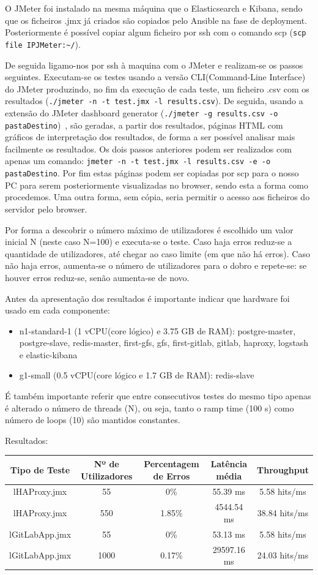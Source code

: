 \documentclass{article}
\begin{document}
O JMeter foi instalado na mesma máquina que o Elasticsearch e Kibana, sendo que os ficheiros .jmx já criados são copiados pelo Ansible na fase de deployment. Posteriormente é possível copiar algum ficheiro por ssh com o comando scp (\verb|scp file IPJMeter:~/|).

De seguida ligamo-nos por ssh à maquina com o JMeter e realizam-se os passos seguintes.
Executam-se os testes usando a versão CLI(Command-Line Interface) do JMeter produzindo, no fim da execução de cada teste, um ficheiro .csv com os resultados (\verb|./jmeter -n -t test.jmx -l results.csv|). De seguida, usando a extensão do JMeter dashboard generator (\verb|./jmeter -g results.csv -o pastaDestino|)~\cite{genDash}, são geradas, a partir dos resultados, páginas HTML com gráficos de interpretação dos resultados, de forma a ser possível analisar mais facilmente os resultados. Os dois passos anteriores podem ser realizados com apenas um comando: \verb|jmeter -n -t test.jmx -l results.csv -e -o pastaDestino|.
Por fim estas páginas podem ser copiadas por scp para o nosso PC para serem posteriormente visualizadas no browser, sendo esta a forma como procedemos. Uma outra forma, sem cópia, seria permitir o acesso aos ficheiros do servidor pelo browser.

Por forma a descobrir o número máximo de utilizadores é escolhido um valor inicial N (neste caso N=100) e executa-se o teste. Caso haja erros reduz-se a quantidade de utilizadores, até chegar ao caso limite (em que não há erros). Caso não haja erros, aumenta-se o número de utilizadores para o dobro e repete-se: se houver erros reduz-se, senão aumenta-se de novo.

Antes da apresentação dos resultados é importante indicar que hardware foi usado em cada componente:
\begin{itemize}
    \item n1-standard-1 (1 vCPU(core lógico) e 3.75 GB de RAM): postgre-master, postgre-slave, redis-master, first-gfs, gfs, first-gitlab, gitlab, haproxy, logstash e elastic-kibana
    \item g1-small (0.5 vCPU(core lógico e 1.7 GB de RAM): redis-slave
\end{itemize}
É também importante referir que entre consecutivos testes do mesmo tipo apenas é alterado o número de threads (N), ou seja, tanto o ramp time (100 s) como número de loops (10) são mantidos constantes.

Resultados:
\begin{center}
  \begin{tabular}{| c | c | c | c | c |}
    \hline
    Tipo de Teste & Nº de Utilizadores & Percentagem de Erros & Latência média & Throughput \\ \hline
    lHAProxy.jmx & 55 & 0\% & 55.39 ms & 5.58 hits/ms \\ \hline
    lHAProxy.jmx & 550 & 1.85\% & 4544.54 ms & 38.84 hits/ms \\ \hline
    lGitLabApp.jmx & 55 & 0\% & 53.13 ms & 5.58 hits/ms \\ \hline
    lGitLabApp.jmx & 1000 & 0.17\% & 29597.16 ms & 24.03 hits/ms \\ \hline
  \end{tabular}
\end{center}
\end{document}
